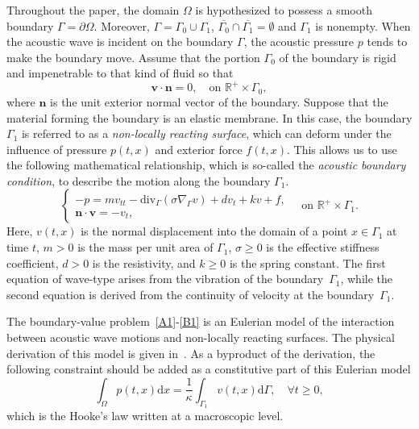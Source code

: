 \documentclass[10pt]{elsarticle}
\begin{document}
Throughout the paper, the domain $\Omega$ is hypothesized to possess a smooth boundary $\Gamma = \partial\Omega$. Moreover, $\Gamma = \Gamma_0\cup\Gamma_1$, $\overline{\Gamma_0}\cap\overline{\Gamma_1} = \emptyset$ and $\Gamma_1$ is nonempty.
When the acoustic wave is incident on the boundary $\Gamma$, the acoustic pressure $p$ tends to make the boundary move. 
Assume that the portion $\Gamma_0$ of the boundary is rigid and impenetrable to that kind of fluid so that
\begin{equation} 
	 \mathbf{v}\cdot\mathbf{n} = 0,  \quad \textrm{on $\mathbb{R}^{+} \times \Gamma_0$}, \label{B0} 
\end{equation}
where $\mathbf{n}$ is the unit exterior normal vector of the boundary. 
Suppose that the material forming the boundary is an elastic membrane. In this case, the boundary $\Gamma_1$ is referred to as a \emph{non-locally reacting surface}, which can deform under the influence of pressure $p(t, x)$ and exterior force $f(t, x)$. This allows us to use the following mathematical relationship, which is so-called the \emph{acoustic boundary condition}, to describe the motion along the boundary $\Gamma_1$.  
\begin{equation} \label{B1}
\left
    \{
        \begin{array}{ll}
            -p= m v_{tt} - \mathrm{div}_{\Gamma}\left(\sigma\nabla_{\Gamma} v\right) + d v_t + k v + f,\\ 
             \mathbf{n}\cdot \mathbf{v}=-v_t, 
        \end{array} 
\right. \quad \textrm{on $\mathbb{R}^{+} \times \Gamma_1$}.
\end{equation}
Here, $v(t, x)$ is the normal displacement into the domain of a point $x \in \Gamma_1$ at time $t$, $m>0$ is the mass per unit area of $\Gamma_1$, $\sigma\geqslant0$ is the effective stiffness coefficient, $d>0$ is the resistivity, and $k\geqslant0$ is the spring constant. The first equation of wave-type arises from the vibration of the boundary~$\Gamma_1$, while the second equation is derived from the continuity of velocity at the boundary~$\Gamma_1$.


The boundary-value problem~\eqref{A1}-\eqref{B1} is an Eulerian model of the interaction between acoustic wave motions and non-locally reacting surfaces. The physical derivation of this model is given in~\cite[Chapter 7]{mugnolo2024wave}. As a byproduct of the derivation, the following constraint should be added as a constitutive part of this Eulerian model
\begin{equation}\label{Co}
\int_{\Omega}p(t, x)\mathrm{d}x = \frac{1}{\kappa}\int_{\Gamma_1}v(t, x)\mathrm{d}\Gamma, \quad \forall t\geqslant 0,
\end{equation}
which is the Hooke's law written at a macroscopic level.
\end{document}
